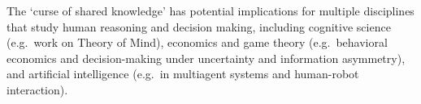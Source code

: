 The `curse of shared knowledge' has potential implications for multiple disciplines that study human reasoning and decision making, including cognitive science (e.g.\ work on Theory of Mind), economics and game theory (e.g.\ behavioral economics and decision-making under uncertainty and information asymmetry), and artificial intelligence (e.g.\ in multiagent systems and human-robot interaction).   






























